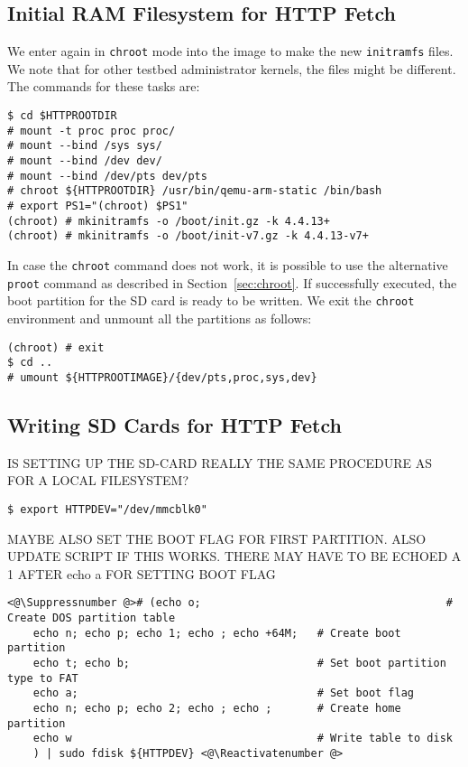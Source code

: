 \subsection{Initial RAM Filesystem for HTTP Fetch}
We enter again in \texttt{chroot} mode into the image to make the new
\texttt{initramfs} files. We note that for other testbed administrator
kernels, the files might be different. The commands for these tasks are:

\begin{lstlisting}[]
$ cd $HTTPROOTDIR
# mount -t proc proc proc/
# mount --bind /sys sys/
# mount --bind /dev dev/
# mount --bind /dev/pts dev/pts
# chroot ${HTTPROOTDIR} /usr/bin/qemu-arm-static /bin/bash
# export PS1="(chroot) $PS1"
(chroot) # mkinitramfs -o /boot/init.gz -k 4.4.13+
(chroot) # mkinitramfs -o /boot/init-v7.gz -k 4.4.13-v7+
\end{lstlisting}
\FloatBarrier
\vspace{-5mm}

In case the \texttt{chroot} command does not work, it is possible to use
the alternative \texttt{proot} command as described in
Section~\ref{sec:chroot}. If successfully executed, the boot partition for
the SD card is ready to be written. We exit the \texttt{chroot} environment
and unmount all the partitions as follows:

\begin{lstlisting}[]
(chroot) # exit
$ cd ..
# umount ${HTTPROOTIMAGE}/{dev/pts,proc,sys,dev}
\end{lstlisting}
\FloatBarrier
\vspace{-5mm}

\subsection{Writing SD Cards for HTTP Fetch}

IS SETTING UP THE SD-CARD REALLY THE SAME PROCEDURE AS FOR A LOCAL FILESYSTEM?

\begin{lstlisting}[]
$ export HTTPDEV="/dev/mmcblk0"
\end{lstlisting}
\FloatBarrier
\vspace{-5mm}

MAYBE ALSO SET THE BOOT FLAG FOR FIRST PARTITION. ALSO UPDATE SCRIPT IF THIS
WORKS. THERE MAY HAVE TO BE ECHOED A 1 AFTER echo a FOR SETTING BOOT FLAG
\begin{lstlisting}[]
<@\Suppressnumber @># (echo o;                                      # Create DOS partition table
    echo n; echo p; echo 1; echo ; echo +64M;   # Create boot partition
    echo t; echo b;                             # Set boot partition type to FAT
    echo a;                                     # Set boot flag
    echo n; echo p; echo 2; echo ; echo ;       # Create home partition
    echo w                                      # Write table to disk
    ) | sudo fdisk ${HTTPDEV} <@\Reactivatenumber @>
\end{lstlisting}
\FloatBarrier
\vspace{-5mm}

